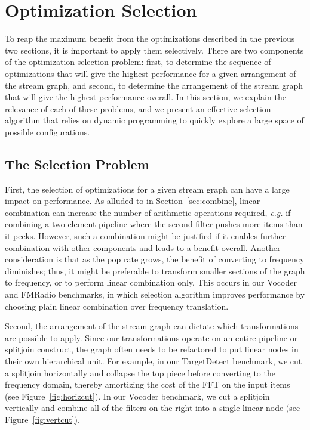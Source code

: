 
\section{Optimization Selection}
\label{sec:partitioning}

To reap the maximum benefit from the optimizations described in the
previous two sections, it is important to apply them selectively.
There are two components of the optimization selection problem: first,
to determine the sequence of optimizations that will give the highest
performance for a given arrangement of the stream graph, and second,
to determine the arrangement of the stream graph that will give the
highest performance overall.  In this section, we explain the
relevance of each of these problems, and we present an effective
selection algorithm that relies on dynamic programming to quickly
explore a large space of possible configurations.

\subsection{The Selection Problem}

First, the selection of optimizations for a given stream graph can
have a large impact on performance.  As alluded to in
Section~\ref{sec:combine}, linear combination can increase the number
of arithmetic operations required, {\it e.g.} if combining a
two-element pipeline where the second filter pushes more items than it
peeks.  However, such a combination might be justified if it enables
further combination with other components and leads to a benefit
overall.  Another consideration is that as the pop rate grows, the
benefit of converting to frequency diminishes; thus, it might be
preferable to transform smaller sections of the graph to frequency, or
to perform linear combination only.  This occurs in our Vocoder and
FMRadio benchmarks, in which selection algorithm improves performance
by choosing plain linear combination over frequency translation.

Second, the arrangement of the stream graph can dictate which
transformations are possible to apply.  Since our transformations
operate on an entire pipeline or splitjoin construct, the graph often
needs to be refactored to put linear nodes in their own hierarchical
unit.  For example, in our TargetDetect benchmark, we cut a splitjoin
horizontally and collapse the top piece before converting to the
frequency domain, thereby amortizing the cost of the FFT on the input
items (see Figure~\ref{fig:horizcut}).  In our Vocoder benchmark, we
cut a splitjoin vertically and combine all of the filters on the right
into a single linear node (see Figure~\ref{fig:vertcut}).

